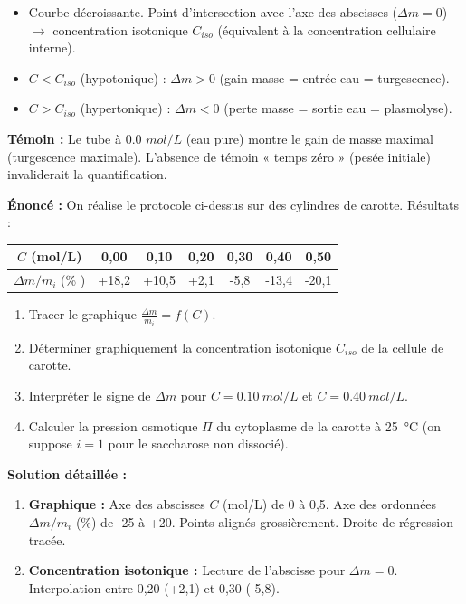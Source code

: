 \documentclass[11pt]{article}
\begin{document}
\begin{methode}
\begin{itemize}
    \item Courbe décroissante. Point d'intersection avec l'axe des abscisses ($\Delta m = 0$) $\to$ concentration isotonique $C_{iso}$ (équivalent à la concentration cellulaire interne).
    \item $C < C_{iso}$ (hypotonique) : $\Delta m > 0$ (gain masse = entrée eau = turgescence).
    \item $C > C_{iso}$ (hypertonique) : $\Delta m < 0$ (perte masse = sortie eau = plasmolyse).
\end{itemize}
\textbf{Témoin :} Le tube à \num{0,0} $\si{mol/L}$ (eau pure) montre le gain de masse maximal (turgescence maximale). L'absence de témoin « temps zéro » (pesée initiale) invaliderait la quantification.
\end{methode}

\begin{exoresolu}
\textbf{Énoncé :} On réalise le protocole ci-dessus sur des cylindres de carotte. Résultats :
\begin{center}
\begin{tabular}{|c|c|c|c|c|c|c|}\hline
$C$ (\si{mol/L}) & 0,00 & 0,10 & 0,20 & 0,30 & 0,40 & 0,50 \\ \hline
$\Delta m / m_i$ (\% ) & +18,2 & +10,5 & +2,1 & -5,8 & -13,4 & -20,1 \\ \hline
\end{tabular}
\end{center}
\begin{enumerate}
    \item Tracer le graphique $\frac{\Delta m}{m_i} = f(C)$.
    \item Déterminer graphiquement la concentration isotonique $C_{iso}$ de la cellule de carotte.
    \item Interpréter le signe de $\Delta m$ pour $C = \SI{0,10}{mol/L}$ et $C = \SI{0,40}{mol/L}$.
    \item Calculer la pression osmotique $\Pi$ du cytoplasme de la carotte à \SI{25}{\celsius} (on suppose $i=1$ pour le saccharose non dissocié).
\end{enumerate}
\tcblower
\textbf{Solution détaillée :}
\begin{enumerate}
    \item \textbf{Graphique :} Axe des abscisses $C$ (\si{mol/L}) de 0 à 0,5. Axe des ordonnées $\Delta m/m_i$ (\%) de -25 à +20. Points alignés grossièrement. Droite de régression tracée.
    \item \textbf{Concentration isotonique :} Lecture de l'abscisse pour $\Delta m = 0$. Interpolation entre 0,20 (+2,1) et 0,30 (-5,8).

\end{enumerate}
\end{exoresolu}
\end{document}
